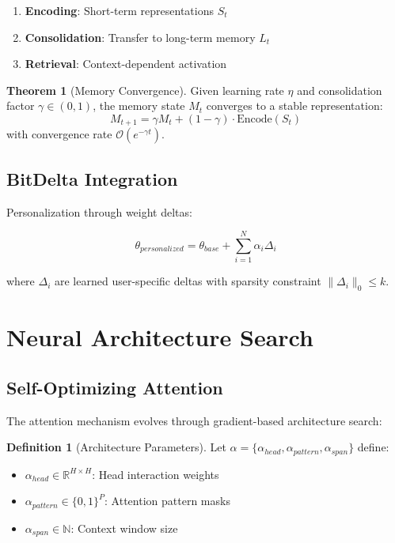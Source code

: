 \documentclass[11pt,a4paper]{article}
\theoremstyle{definition}
\newtheorem{definition}{Definition}
\newtheorem{theorem}{Theorem}
\begin{document}
\begin{enumerate}
\item \textbf{Encoding}: Short-term representations $S_t$
\item \textbf{Consolidation}: Transfer to long-term memory $L_t$
\item \textbf{Retrieval}: Context-dependent activation
\end{enumerate}

\begin{theorem}[Memory Convergence]
Given learning rate $\eta$ and consolidation factor $\gamma \in (0,1)$, the memory state $M_t$ converges to a stable representation:
\begin{equation}
M_{t+1} = \gamma M_t + (1-\gamma) \cdot \text{Encode}(S_t)
\end{equation}
with convergence rate $\mathcal{O}(e^{-\gamma t})$.
\end{theorem}

\subsection{BitDelta Integration}

Personalization through weight deltas:

\begin{equation}
\theta_{personalized} = \theta_{base} + \sum_{i=1}^{N} \alpha_i \Delta_i
\end{equation}

where $\Delta_i$ are learned user-specific deltas with sparsity constraint $\|\Delta_i\|_0 \leq k$.

\section{Neural Architecture Search}

\subsection{Self-Optimizing Attention}

The attention mechanism evolves through gradient-based architecture search:

\begin{definition}[Architecture Parameters]
Let $\alpha = \{\alpha_{head}, \alpha_{pattern}, \alpha_{span}\}$ define:
\begin{itemize}
\item $\alpha_{head} \in \mathbb{R}^{H \times H}$: Head interaction weights
\item $\alpha_{pattern} \in \{0,1\}^{P}$: Attention pattern masks
\item $\alpha_{span} \in \mathbb{N}$: Context window size
\end{itemize}
\end{definition}
\end{document}
